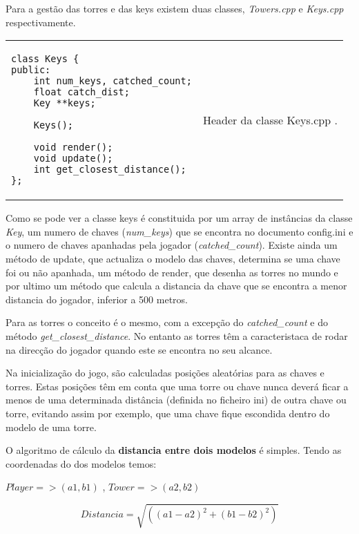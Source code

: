Para a gestão das torres e das keys existem duas classes, \textit{Towers.cpp} e \textit{Keys.cpp} respectivamente.

\-
\begin{center}
\begin{tabular} {l | p{10cm}}
\begin{lstlisting}
class Keys {
public:
    int num_keys, catched_count;
    float catch_dist;
    Key **keys;

    Keys();

    void render();
    void update();
    int get_closest_distance();
};
\end{lstlisting} 
& 
Header da classe Keys.cpp .
\end{tabular}
\end{center}
\-
Como se pode ver a classe keys é constituida por um array de instâncias da classe \emph{Key}, um numero de chaves (\emph{num\_keys}) que se encontra no documento config.ini e o numero de chaves apanhadas pela jogador (\emph{catched\_count}).
Existe ainda um método de update, que actualiza o modelo das chaves, determina se uma chave foi ou não apanhada, um método de render, que desenha as torres no mundo e por ultimo um método que calcula a distancia da chave que se encontra a menor distancia do jogador, inferior a 500 metros.

Para as torres o conceito é o mesmo, com a excepção do \emph{catched\_count} e do método \emph{get\_closest\_distance}.
No entanto as torres têm a caracteristaca de rodar na direcção do jogador quando este se encontra no seu alcance.

Na inicialização do jogo, são calculadas posições aleatórias para as chaves e torres. Estas posições têm em conta que uma torre ou chave nunca deverá ficar a menos de uma determinada distância (definida no ficheiro ini) de outra chave ou torre, evitando assim por exemplo, que uma chave fique escondida dentro do modelo de uma torre.

O algoritmo de cálculo da {\bf distancia entre dois modelos} é simples. Tendo as coordenadas do dos modelos temos:

\begin{center}
\begin{math}
Player => (a1,b1)
\end{math}
,
\begin{math}
Tower => (a2,b2)
\end{math}

\begin{equation}
Distancia = \sqrt{((a1-a2)^2+(b1-b2)^2)}
\end{equation}
\end{center}


